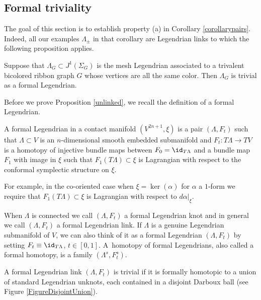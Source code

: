 \subsection{Formal triviality}\label{formal triviality}
The goal of this section is to establish property (a) in Corollary \ref{corollarypairs}. Indeed, all our examples $\Lambda_{\pm}$ in that corollary are Legendrian links to which the following proposition applies.

\begin{proposition}\label{unlinked} Suppose that $\Lambda_G \subset J^1(\Sigma_G)$ is the mesh Legendrian associated to a trivalent bicolored ribbon graph $G$ whose vertices are all the same color. Then $\Lambda_G$ is trivial as a formal Legendrian.
\end{proposition}

Before we prove Proposition \ref{unlinked}, we recall the definition of a formal Legendrian.

\begin{definition}
A formal Legendrian in a contact manifold $(V^{2n+1},\xi)$ is a pair $(\Lambda, F_t)$ such that $\Lambda \subset V$ is an $n$-dimensional smooth embedded submanifold and $F_t: T \Lambda \to TV$ is a homotopy of injective bundle maps between $F_0=\id_{T\Lambda}$ and a bundle map $F_1$ with image in $\xi$ such that $F_1(T\Lambda) \subset \xi$ is Lagrangian with respect to the conformal symplectic structure on $\xi$.
\end{definition}

\begin{remark}
For example, in the co-oriented case when $\xi= \ker(\alpha)$ for $\alpha$ a $1$-form we require that $F_1(T\Lambda) \subset \xi$ is Lagrangian with respect to $d \alpha |_\xi$.
\end{remark}

When $\Lambda$ is connected we call $(\Lambda, F_t)$ a formal Legendrian knot and in general we call $(\Lambda, F_t)$ a formal Legendrian link. If $\Lambda$ is a genuine Legendrian submanifold of $V$, we can also think of it as a formal Legendrian $(\Lambda, F_t)$ by setting $F_t \equiv \id_{T\Lambda}$, $t \in [0,1]$. A~homotopy of formal Legendrians, also called a formal homotopy, is a family $(\Lambda^s,F_t^s)$.

\begin{definition}
A formal Legendrian link $(\Lambda, F_t)$ is trivial if it is formally homotopic to a union of standard Legendrian unknots, each contained in a disjoint Darboux ball (see Figure \ref{FigureDisjointUnion}).
\end{definition}

